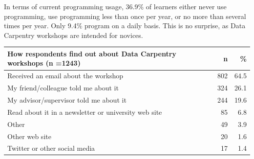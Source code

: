 \documentclass[]{article}
\begin{document}
In terms of current programming usage, 36.9\% of learners either never
use programming, use programming less than once per year, or no more
than several times per year. Only 9.4\% program on a daily basis. This
is no surprise, as Data Carpentry workshops are intended for novices.

\begin{longtable}[]{@{}lrr@{}}
\toprule
How respondents find out about Data Carpentry workshops (n =1243) & n &
\%\tabularnewline
\midrule
\endhead
Received an email about the workshop & 802 & 64.5\tabularnewline
My friend/colleague told me about it & 324 & 26.1\tabularnewline
My advisor/supervisor told me about it & 244 & 19.6\tabularnewline
Read about it in a newsletter or university web site & 85 &
6.8\tabularnewline
Other & 49 & 3.9\tabularnewline
Other web site & 20 & 1.6\tabularnewline
Twitter or other social media & 17 & 1.4\tabularnewline
\bottomrule
\end{longtable}
\end{document}
